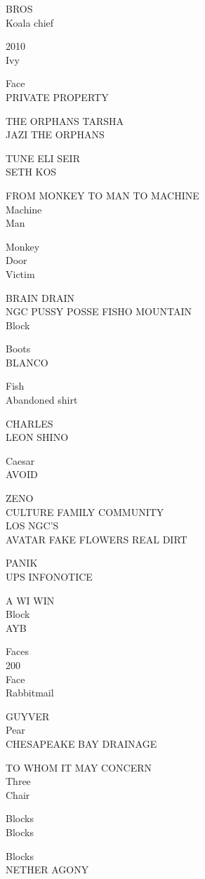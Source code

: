 \documentclass[10pt,letterpaper]{article}
\begin{document}
BROS\\
Koala chief

2010\\
Ivy

Face\\
PRIVATE PROPERTY

THE ORPHANS TARSHA\\
JAZI THE ORPHANS

TUNE ELI SEIR\\
SETH KOS

FROM MONKEY TO MAN TO MACHINE\\
Machine\\
Man

Monkey\\
Door\\
Victim

BRAIN DRAIN\\
NGC PUSSY POSSE FISHO MOUNTAIN\\
Block

Boots\\
BLANCO

Fish\\
Abandoned shirt

CHARLES\\
LEON SHINO

Caesar\\
AVOID

ZENO\\
CULTURE FAMILY COMMUNITY\\
LOS NGC'S\\
AVATAR FAKE FLOWERS REAL DIRT

PANIK\\
UPS INFONOTICE

A WI WIN\\
Block\\
AYB

Faces\\
200\\
Face\\
Rabbitmail

GUYVER\\
Pear\\
CHESAPEAKE BAY DRAINAGE

TO WHOM IT MAY CONCERN\\
Three\\
Chair

Blocks\\
Blocks

Blocks\\
NETHER AGONY
\end{document}
